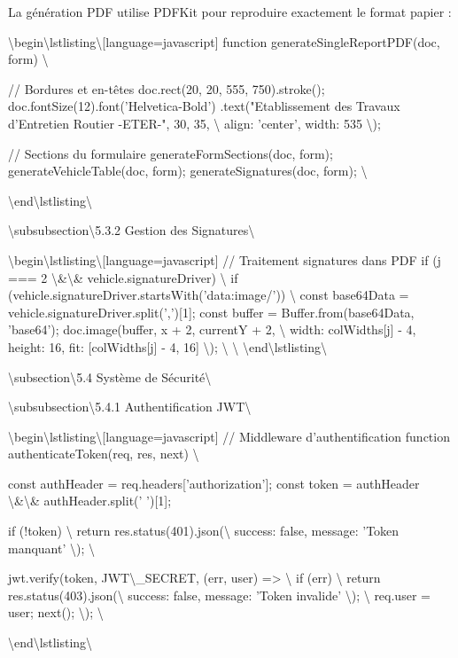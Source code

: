 \documentclass[12pt,a4paper]{report}
\begin{document}
La génération PDF utilise PDFKit pour reproduire exactement le format papier :

\textbackslash{}begin\textbackslash{}{lstlisting\textbackslash{}}[language=javascript]
function generateSingleReportPDF(doc, form) \textbackslash{}{
    // Bordures et en-têtes
    doc.rect(20, 20, 555, 750).stroke();
    doc.fontSize(12).font('Helvetica-Bold')
       .text("Etablissement des Travaux d'Entretien Routier -ETER-", 
             30, 35, \textbackslash{}{ align: 'center', width: 535 \textbackslash{}});
    
    // Sections du formulaire
    generateFormSections(doc, form);
    generateVehicleTable(doc, form);
    generateSignatures(doc, form);
\textbackslash{}}
\textbackslash{}end\textbackslash{}{lstlisting\textbackslash{}}

\textbackslash{}subsubsection\textbackslash{}{5.3.2 Gestion des Signatures\textbackslash{}}

\textbackslash{}begin\textbackslash{}{lstlisting\textbackslash{}}[language=javascript]
// Traitement signatures dans PDF
if (j === 2 \textbackslash{}&\textbackslash{}& vehicle.signatureDriver) \textbackslash{}{
    if (vehicle.signatureDriver.startsWith('data:image/')) \textbackslash{}{
        const base64Data = vehicle.signatureDriver.split(',')[1];
        const buffer = Buffer.from(base64Data, 'base64');
        doc.image(buffer, x + 2, currentY + 2, \textbackslash{}{ 
            width: colWidths[j] - 4, 
            height: 16,
            fit: [colWidths[j] - 4, 16]
        \textbackslash{}});
    \textbackslash{}}
\textbackslash{}}
\textbackslash{}end\textbackslash{}{lstlisting\textbackslash{}}

\textbackslash{}subsection\textbackslash{}{5.4 Système de Sécurité\textbackslash{}}

\textbackslash{}subsubsection\textbackslash{}{5.4.1 Authentification JWT\textbackslash{}}

\textbackslash{}begin\textbackslash{}{lstlisting\textbackslash{}}[language=javascript]
// Middleware d'authentification
function authenticateToken(req, res, next) \textbackslash{}{
    const authHeader = req.headers['authorization'];
    const token = authHeader \textbackslash{}&\textbackslash{}& authHeader.split(' ')[1];
    
    if (!token) \textbackslash{}{
        return res.status(401).json(\textbackslash{}{ 
            success: false, 
            message: 'Token manquant' 
        \textbackslash{}});
    \textbackslash{}}
    
    jwt.verify(token, JWT\textbackslash{}_SECRET, (err, user) => \textbackslash{}{
        if (err) \textbackslash{}{
            return res.status(403).json(\textbackslash{}{ 
                success: false, 
                message: 'Token invalide' 
            \textbackslash{}});
        \textbackslash{}}
        req.user = user;
        next();
    \textbackslash{}});
\textbackslash{}}
\textbackslash{}end\textbackslash{}{lstlisting\textbackslash{}}
\end{document}
